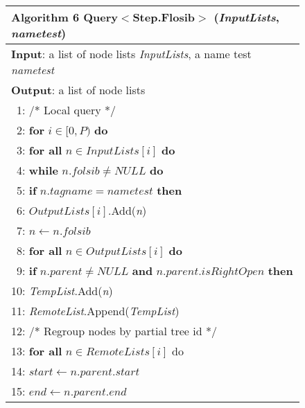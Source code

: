 \begin{figure}[t]
	\centering
	\label{fig:algQueryFolsib}
	\begin{tabular}{l}
		\hline
		\textbf{Algorithm 6} Query$<$Step.Flosib$>$ (\emph{InputLists}, \emph{nametest}) \\
		\hline
		\textbf{Input}: a list of node lists \emph{InputLists}, a name test \emph{nametest} \\
		\textbf{Output}: a list of node lists  \\
		~1: \hspace{1 mm} /* Local query */ \\
		~2: \hspace{1 mm} \textbf{for} $i \in [0, P)$ \textbf{do} \\
		~3: \hspace{4 mm} \textbf{for all} $n \in InputLists[i]$ \textbf{do} \\
		~4: \hspace{8 mm} \textbf{while} $n.folsib \neq NULL$ \textbf{do} \\
		~5: \hspace{12 mm} \textbf{if} $n.tagname = nametest$ \textbf{then} \\
		~6: \hspace{16 mm} $OutputLists[i]$.Add(\emph{n})\\
		~7: \hspace{12 mm} $n \leftarrow n.folsib$ \\
		~8: \hspace{4 mm} \textbf{for all} $n \in OutputLists[i]$ \textbf{do} \\
		~9: \hspace{8 mm} \textbf{if} $n.parent \neq NULL \textbf{ and } n.parent.isRightOpen$ \textbf{then}\\
		10: \hspace{12 mm} \emph{TempList}.Add(\emph{n})\\
		11: \hspace{4 mm} \emph{RemoteList}.Append(\emph{TempList}) \\
		12: \hspace{0 mm} /* Regroup nodes by partial tree id */\\
		13: \hspace{0 mm} \textbf{for all} $n \in RemoteLists[i]$ do  \\
		14: \hspace{4 mm}  $start \leftarrow n.parent.start$ \\
		15: \hspace{4 mm} $end \leftarrow n.parent.end$ \\

\end{tabular}
\end{figure}
